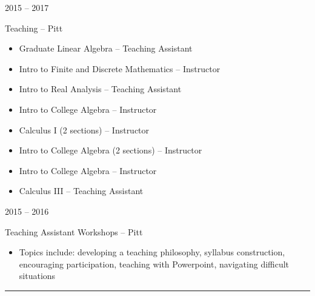 \documentclass[a4paper,10pt]{article}
\newlength{\cvcolumngapwidth}
\newlength{\cvleftcolumnwidth}
\newlength{\cvrightcolumnwidth}
\newcommand{\cvsectionstyle}[1]{{\normalsize\cvsectionfont\textcolor{cvsectioncolor}{#1}}}
\newcommand{\cvtitlestyle}[1]{{\large\cvtitlefont\textcolor{cvtitlecolor}{#1}}}
\newcommand{\cvheadingstyle}[1]{{\normalsize\cvheadingfont\textcolor{cvheadingcolor}{#1}}}
\newlength{\cvafteritemskipamount}
\newlength{\cvaftersectionskipamount}
\newlength{\cvbetweensectionandheadingextraskipamount}
\newlength{\cvaftertitleskipamount}
\newlength{\cvparskip}
\newcommand{\cvsection}[1]{
            \begin{minipage}[t]{\cvleftcolumnwidth}
                \raggedleft\cvsectionstyle{#1}
            \end{minipage}%
            \hspace{\cvcolumngapwidth}%
            \begin{minipage}[t]{\cvrightcolumnwidth}
                \textcolor{cvrulecolor}{\rule{\cvrightcolumnwidth}{0.3mm}}
            \end{minipage}
        
            \vspace{\cvaftersectionskipamount}
        }
\newcommand{\cvitem}[2]{
            \begin{minipage}[t]{\cvleftcolumnwidth}
                \raggedleft #1
            \end{minipage}%
            \hspace{\cvcolumngapwidth}%
            \begin{minipage}[t]{\cvrightcolumnwidth}
                \setlength{\parskip}{\cvparskip} #2
            \end{minipage}
        
            \vspace{\cvafteritemskipamount}
        }
\newcommand{\cvtitle}[1]{
            \cvtitlestyle{#1}
        
            \vspace{\cvaftertitleskipamount}
            \vspace{-\cvparskip}
        }
\begin{document}
        \cvitem{
            \cvheadingstyle{2015 -- 2017}
        }{
            \cvtitle{Teaching -- Pitt}
            \begin{itemize}[leftmargin=*]
                \item Graduate Linear Algebra -- Teaching Assistant
                	\item Intro to Finite and Discrete Mathematics -- Instructor
        	\item Intro to Real Analysis -- Teaching Assistant
            	\item Intro to College Algebra -- Instructor
            	\item Calculus I (2 sections) -- Instructor
        	\item Intro to College Algebra (2 sections) -- Instructor
        	\item Intro to College Algebra -- Instructor
        	\item Calculus III -- Teaching Assistant
            \end{itemize}
        
        }
        
        \cvitem{
            \cvheadingstyle{2015 -- 2016}
        }{
            \cvtitle{Teaching Assistant Workshops -- Pitt}
            \begin{itemize}[leftmargin=*]
                \item Topics include: developing a teaching philosophy, syllabus construction, encouraging participation, teaching with Powerpoint, navigating difficult situations
            \end{itemize}
            
        }
        
            
        \cvsection{PRESENTATIONS}
        \vspace{\cvbetweensectionandheadingextraskipamount}
        
\end{document}
